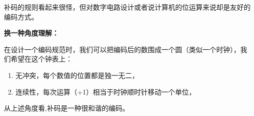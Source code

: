 补码的规则看起来很怪，但对数字电路设计或者说计算机的位运算来说却是友好的编码方式。

\textbf{换一种角度理解：}

在设计一个编码规范时，我们可以把编码后的数围成一个圆（类似一个时钟），我们希望在这个钟表上：
\begin{enumerate}
\item 
无冲突，每个数值的位置都是独一无二，
\item 
连续性，每次运算（+1）相当于时钟顺时针移动一个单位，
\end{enumerate}

从上述角度看,补码是一种很和谐的编码。







